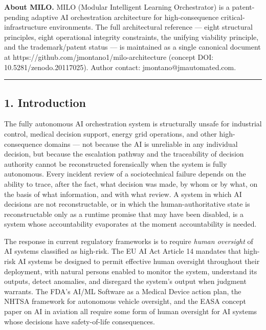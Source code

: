 \textbf{About MILO.} MILO (Modular Intelligent Learning Orchestrator) is
a patent-pending adaptive AI orchestration architecture for
high-consequence critical-infrastructure environments. The full
architectural reference --- eight structural principles, eight
operational integrity constraints, the unifying viability principle, and
the trademark/patent status --- is maintained as a single canonical
document at https://github.com/jmontano1/milo-architecture (concept DOI:
10.5281/zenodo.20117025). Author contact: jmontano@jmautomated.com.

\begin{center}\rule{0.5\linewidth}{0.5pt}\end{center}

\subsection{1. Introduction}\label{introduction}

The fully autonomous AI orchestration system is structurally unsafe for
industrial control, medical decision support, energy grid operations,
and other high-consequence domains --- not because the AI is unreliable
in any individual decision, but because the escalation pathway and the
traceability of decision authority cannot be reconstructed forensically
when the system is fully autonomous. Every incident review of a
sociotechnical failure depends on the ability to trace, after the fact,
what decision was made, by whom or by what, on the basis of what
information, and with what review. A system in which AI decisions are
not reconstructable, or in which the human-authoritative state is
reconstructable only as a runtime promise that may have been disabled,
is a system whose accountability evaporates at the moment accountability
is needed.

The response in current regulatory frameworks is to require \emph{human
oversight} of AI systems classified as high-risk. The EU AI Act Article
14 \cite{ref1} mandates that high-risk AI systems be designed to permit
effective human oversight throughout their deployment, with natural
persons enabled to monitor the system, understand its outputs, detect
anomalies, and disregard the system's output when judgment warrants. The
FDA's AI/ML Software as a Medical Device action plan, the NHTSA
framework for autonomous vehicle oversight, and the EASA concept paper
on AI in aviation all require some form of human oversight for AI
systems whose decisions have safety-of-life consequences.

